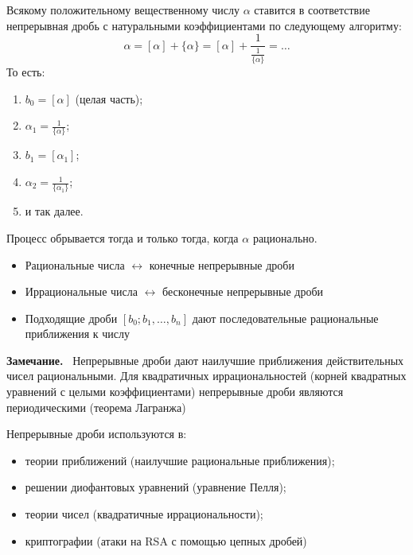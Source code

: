 \documentclass[a4paper,12pt]{article}
\newcommand{\myremark}{\textbf{Замечание.}\ }
\theoremstyle{definition}
\theoremstyle{plain}
\theoremstyle{remark}
\begin{document}
	\begin{tcolorbox}[colback=blue!5, colframe=blue!40!black, title=Алгоритм разложения]
		Всякому положительному вещественному числу $\alpha$ ставится в соответствие непрерывная дробь с натуральными коэффициентами по следующему алгоритму:
		\[
		\alpha = [\alpha] + \{\alpha\} = [\alpha] + \frac{1}{\frac{1}{\{\alpha\}}} = \dots
		\]
		То есть:
		\begin{enumerate}
			\item $b_0 = [\alpha]$ (целая часть);
			\item $\alpha_1 = \frac{1}{\{\alpha\}}$;
			\item $b_1 = [\alpha_1]$;
			\item $\alpha_2 = \frac{1}{\{\alpha_1\}}$;
			\item и так далее.
		\end{enumerate}
		Процесс обрывается тогда и только тогда, когда $\alpha$ рационально.
	\end{tcolorbox}
	
	\begin{tcolorbox}[colback=red!5, colframe=red!70!black, title=Итог теоремы]
		\begin{itemize}
			\item Рациональные числа $\longleftrightarrow$ конечные непрерывные дроби
			\item Иррациональные числа $\longleftrightarrow$ бесконечные непрерывные дроби
			\item Подходящие дроби $[b_0; b_1, \dots, b_n]$ дают последовательные рациональные приближения к числу
		\end{itemize}
	\end{tcolorbox}
	
	\myremark
	Непрерывные дроби дают наилучшие приближения действительных чисел рациональными. Для квадратичных иррациональностей (корней квадратных уравнений с целыми коэффициентами) непрерывные дроби являются периодическими (теорема Лагранжа)
	
	\begin{tcolorbox}[colback=purple!5, colframe=purple!50!black, title=Заметочка: Применения непрерывных дробей]
		Непрерывные дроби используются в:
		\begin{itemize}
			\item теории приближений (наилучшие рациональные приближения);
			\item решении диофантовых уравнений (уравнение Пелля);
			\item теории чисел (квадратичные иррациональности);
			\item криптографии (атаки на RSA с помощью цепных дробей)
		\end{itemize}
	\end{tcolorbox}
	
\end{document}
